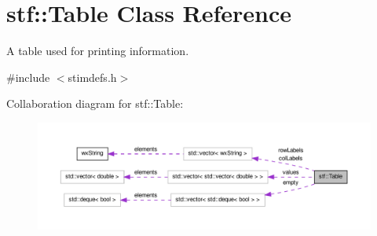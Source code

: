 \hypertarget{classstf_1_1Table}{
\section{stf::Table Class Reference}
\label{classstf_1_1Table}
}


A table used for printing information.  




{\ttfamily \#include $<$stimdefs.h$>$}



Collaboration diagram for stf::Table:
\nopagebreak
\begin{figure}[H]
\begin{center}
\leavevmode
\includegraphics[width=400pt]{classstf_1_1Table__coll__graph}
\end{center}
\end{figure}
